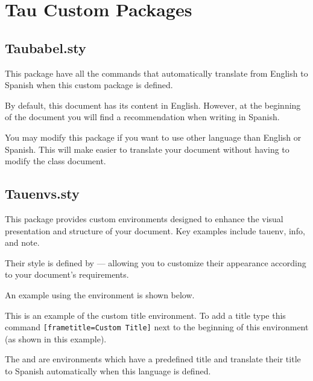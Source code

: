 
\section{Tau Custom Packages}

    \subsection{Taubabel.sty}
		
		This package have all the commands that automatically translate from English to Spanish when this custom package is defined. 
		
		By default, this document has its content in English. However, at the beginning of the document you will find a recommendation when writing in Spanish. 
		
		You may modify this package if you want to use other language than English or Spanish. This will make easier to translate your document without having to modify the class document.

	\subsection{Tauenvs.sty}

        This package provides custom environments designed to enhance the visual presentation and structure of your document. Key examples include tauenv, info, and note.
        
		Their style is defined by  — allowing you to customize their appearance according to your document’s requirements.

		An example using the  environment is shown below.
		
		\begin{tauenv}[frametitle=Custom Title]
			This is an example of the custom title environment. To add a title type this command \verb|[frametitle=Custom Title]| next to the beginning of this environment (as shown in this example).
		\end{tauenv}

        The  and  are environments which have a predefined title and translate their title to Spanish automatically when this language is defined.

